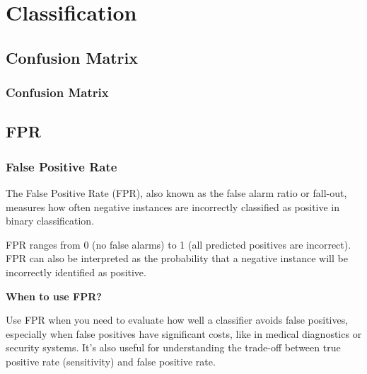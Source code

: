 \chapter{Classification}

\thispagestyle{classificationstyle}
\section{Confusion Matrix}
\subsection{Confusion Matrix}

\clearpage
\section{FPR}
\subsection{False Positive Rate}
\thispagestyle{classificationstyle}

The False Positive Rate (FPR), also known as the false alarm ratio or fall-out, measures how often negative instances are incorrectly classified as positive in binary classification.

\begin{center}
\end{center}

FPR ranges from 0 (no false alarms) to 1 (all predicted positives are incorrect). FPR can also be interpreted as the probability that a negative instance will be incorrectly identified as positive.

\textbf{When to use FPR?}

Use FPR when you need to evaluate how well a classifier avoids false positives, especially when false positives have significant costs, like in medical diagnostics or security systems. It's also useful for understanding the trade-off between true positive rate (sensitivity) and false positive rate.

